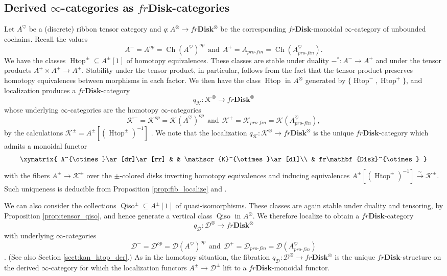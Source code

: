 \documentclass[reqno]{amsart}
\theoremstyle{definition}
\newcommand{\msc}[1]{\mathscr{#1}}
\newcommand{\opn}[1]{\operatorname{#1}}
\newcommand{\ot}{\otimes}
\newcommand{\Disk}{\mathbf{Disk}}
\newcommand{\pf}{pro\text{-}fin}
\renewcommand{\1}{\mathbf{1}}
\begin{document}
\subsection{Derived $\infty$-categories as $fr\Disk$-categories}
\label{sect:fr_htop_der}

Let $A^{\heartsuit}$ be a (discrete) ribbon tensor category and $q:A^{\ot}\to fr\Disk^{\ot}$ be the corresponding $fr\Disk$-monoidal $\infty$-category of unbounded cochains.  Recall the values
\[
A^-=A^{op}=\opn{Ch}(A^{\heartsuit})^{op}\ \ \text{and}\ \ A^+=A_{\pf}=\opn{Ch}(A^{\heartsuit}_{\pf}).
\]
We have the classes $\opn{Htop}^{\pm}\subseteq A^{\pm}[1]$ of homotopy equivalences.  These classes are stable under duality $-^{\ast}:A^-\to A^+$ and under the tensor products $A^{\pm}\times A^{\pm}\to A^{\pm}$.  Stability under the tensor product, in particular, follows from the fact that the tensor product preserves homotopy equivalences between morphisms in each factor.  We then have the class $\opn{Htop}$ in $A^{\ot}$ generated by $\{\opn{Htop}^-,\opn{Htop}^+\}$, and localization produces a $fr\Disk$-category
\[
q_{\msc{K}}:\msc{K}^{\ot}\to fr\Disk^{\ot}
\]
whose underlying $\infty$-categories are the homotopy $\infty$-categories
\[
\msc{K}^-=\msc{K}^{op}=\msc{K}(A^{\heartsuit})^{op}\ \ \text{and}\ \ \msc{K}^+=\msc{K}_{\pf}=\msc{K}(A^{\heartsuit}_{\pf}),
\]
by the calculations $\msc{K}^{\pm}=A^{\pm}[(\opn{Htop}^{\pm})^{-1}]$ \cite[Proposition 1.3.4.5]{ha}.  We note that the localization $q_{\msc{K}}:\msc{K}^{\ot}\to fr\Disk^{\ot}$ is the unique $fr\Disk$-category which admits a monoidal functor
\[
\xymatrix{
A^{\ot}\ar[dr]\ar[rr] & & \msc{K}^{\ot}\ar[dl]\\
	& fr\Disk^{\ot}
	}
\]
with the fibers $A^{\pm}\to \msc{K}^{\pm}$ over the $\pm$-colored disks inverting homotopy equivalences and inducing equivalences $A^{\pm}[(\opn{Htop}^{\pm})^{-1}]\overset{\sim}\to \msc{K}^{\pm}$.  Such uniqueness is deducible from Proposition \ref{prop:fib_localize} and \cite[\href{https://kerodon.net/tag/028B}{028B}]{kerodon}.
\par

We can also consider the collections $\opn{Qiso}^{\pm}\subseteq A^{\pm}[1]$ of quasi-isomorphisms.  These classes are again stable under duality and tensoring, by Proposition \ref{prop:tensor_qiso}, and hence generate a vertical class $\opn{Qiso}$ in $A^{\ot}$. We therefore localize to obtain a $fr\Disk$-category
\[
q_{\msc{D}}:\msc{D}^{\ot}\to fr\Disk^{\ot}
\]
with underlying $\infty$-categories
\[
\msc{D}^-=\msc{D}^{op}=\msc{D}(A^{\heartsuit})^{op}\ \ \text{and}\ \ \msc{D}^+=\msc{D}_{\pf}=\msc{D}(A^{\heartsuit}_{\pf})
\]
\cite[Proposition 1.3.5.15]{ha}.  (See also Section \ref{sect:kan_htop_der}.) As in the homotopy situation, the fibration $q_{\msc{D}}:\msc{D}^{\ot}\to fr\Disk^{\ot}$ is the unique $fr\Disk$-structure on the derived $\infty$-category for which the localization functors $A^{\pm}\to \msc{D}^{\pm}$ lift to a $fr\Disk$-monoidal functor.
\end{document}
